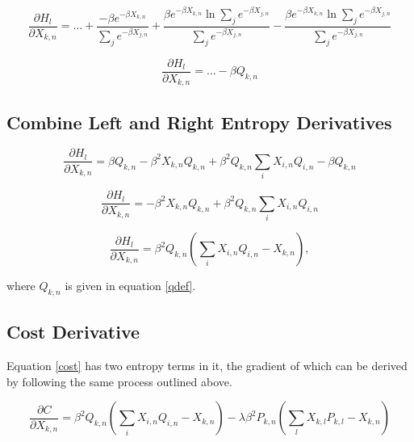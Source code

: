 \begin{displaymath}
    \frac{\partial H_{l}}{\partial X_{k,n}} = \ldots + 
    \frac{-\beta e^{-\beta X_{k,n}}}{\sum_{j}e^{-\beta X_{j,n}}}
    + \frac{\beta e^{-\beta X_{k,n}}\ln{\sum_{j}e^{-\beta X_{j,n}}}}{\sum_{j}e^{-\beta X_{j,n}}}
    - \frac{\beta e^{-\beta X_{k,n}}\ln{\sum_{j}e^{-\beta X_{j,n}}}}{\sum_{j}e^{-\beta X_{j,n}}}
\end{displaymath}

\begin{equation}
    \frac{\partial H_{l}}{\partial X_{k,n}} = \ldots - \beta Q_{k,n}
\label{rightd}
\end{equation}

\subsection{Combine Left and Right Entropy Derivatives}

\begin{displaymath}
    \frac{\partial H_{l}}{\partial X_{k,n}} = \beta Q_{k,n} - \beta^{2} X_{k,n} Q_{k,n} + \beta^{2} Q_{k,n} \sum_{i}X_{i,n}Q_{i,n} - \beta Q_{k,n}
\end{displaymath}

\begin{displaymath}
    \frac{\partial H_{l}}{\partial X_{k,n}} = - \beta^{2}X_{k,n}Q_{k,n} + \beta^{2}Q_{k,n}\sum_{i}X_{i,n}Q_{i,n}
\end{displaymath}

\begin{equation}
    \frac{\partial H_{l}}{\partial X_{k,n}} = \beta^{2}Q_{k,n}\left(\sum_{i}X_{i,n}Q_{i,n} - X_{k,n}\right),
\label{combd}
\end{equation}

\noindent where $Q_{k,n}$ is given in equation \ref{qdef}.

\subsection{Cost Derivative}
\noindent Equation \ref{cost} has two entropy terms in it, the gradient of which can be derived by following the same process outlined above.

\begin{displaymath}
    \frac{\partial C}{\partial X_{k,n}} = \beta^{2} Q_{k,n} \left(\sum_{i}X_{i,n}Q_{i,n} - X_{k,n}\right) - \lambda \beta^{2} P_{k,n} \left( \sum_{l}X_{k,l}P_{k,l} - X_{k,n}\right)
\end{displaymath}

